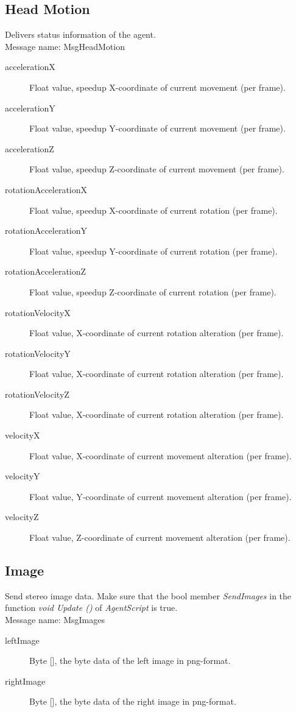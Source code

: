 \documentclass[a4paper,10pt]{scrartcl}
\begin{document}
\subsection{Head Motion}
Delivers status information of the agent.\\
Message name: MsgHeadMotion
\begin{description}
 \item [accelerationX] Float value, speedup X-coordinate of current movement (per frame).
 \item [accelerationY] Float value, speedup Y-coordinate of current movement (per frame).
 \item [accelerationZ] Float value, speedup Z-coordinate of current movement (per frame).
 \item [rotationAccelerationX] Float value, speedup X-coordinate of current rotation (per frame).
 \item [rotationAccelerationY] Float value, speedup Y-coordinate of current rotation (per frame).
 \item [rotationAccelerationZ] Float value, speedup Z-coordinate of current rotation (per frame).
 \item [rotationVelocityX] Float value, X-coordinate of current rotation alteration (per frame).
 \item [rotationVelocityY] Float value, X-coordinate of current rotation alteration (per frame).
 \item [rotationVelocityZ] Float value, X-coordinate of current rotation alteration (per frame).
 \item [velocityX] Float value, X-coordinate of current movement alteration (per frame).
 \item [velocityY] Float value, Y-coordinate of current movement alteration (per frame).
 \item [velocityZ] Float value, Z-coordinate of current movement alteration (per frame).
\end{description}

\subsection{Image}
Send stereo image data. Make sure that the bool member \emph{SendImages} in the function \emph{void Update ()} of \emph{AgentScript} is true.\\
Message name: MsgImages
\begin{description}
 \item [leftImage] Byte [], the byte data of the left image in png-format.
 \item [rightImage] Byte [], the byte data of the right image in png-format.
\end{description}
\end{document}
